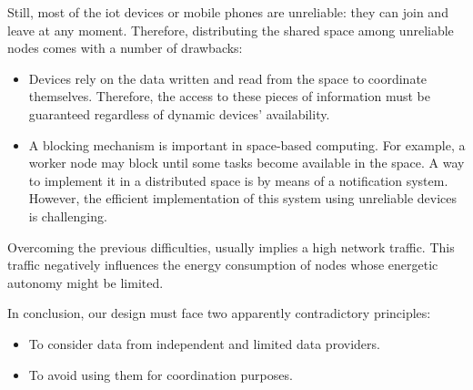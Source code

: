 Still, most of the \ac{iot} devices or mobile phones are unreliable: they can join and leave at any moment.
Therefore, distributing the shared space among unreliable nodes comes with a number of drawbacks:
\begin{itemize}
  \item Devices rely on the data written and read from the space to coordinate themselves.
	Therefore, the access to these pieces of information must be guaranteed regardless of dynamic devices' availability. %
  \item A blocking mechanism is important in space-based computing. 
        For example, a worker node may block until some tasks become available in the space.
        A way to implement it in a distributed space is by means of a notification system.
        However, the efficient implementation of this system using unreliable devices is challenging. %
\end{itemize}
Overcoming the previous difficulties, usually implies a high network traffic.
This traffic negatively influences the energy consumption of nodes whose energetic autonomy might be limited.

\bigskip

In conclusion, our design must face two apparently contradictory principles:
\begin{itemize}
  \item To consider data from independent and limited data providers.
  \item To avoid using them for coordination purposes.
\end{itemize}
